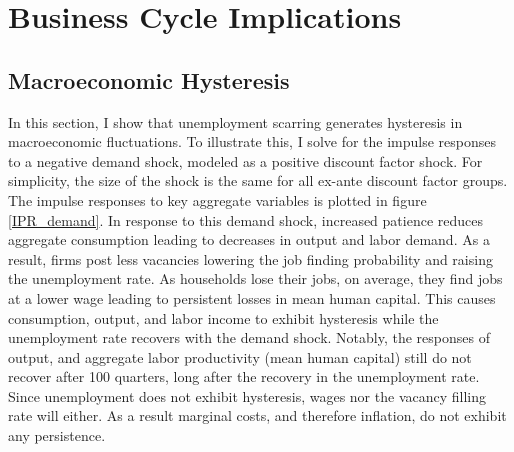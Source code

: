\section{Business Cycle Implications}


\subsection{Macroeconomic Hysteresis}

In this section, I show that unemployment scarring generates hysteresis in macroeconomic fluctuations. To illustrate this, I solve for the impulse responses to a negative demand shock, modeled as a positive discount factor shock. For simplicity, the size of the shock is the same for all ex-ante discount factor groups. The impulse responses to key aggregate variables is plotted in figure \ref{IPR_demand}. In response to this demand shock, increased patience reduces aggregate consumption leading to decreases in output and labor demand. As a result, firms post less vacancies lowering the job finding probability and raising the unemployment rate. As households lose their jobs, on average, they find jobs at a lower wage leading to persistent losses in mean human capital. This causes consumption, output, and labor income to exhibit hysteresis while the unemployment rate recovers with the demand shock. Notably, the responses of output, and aggregate labor productivity (mean human capital) still do not recover after 100 quarters, long after the recovery in the unemployment rate. Since unemployment does not exhibit hysteresis, wages nor the vacancy filling rate will either. As a result marginal costs, and therefore inflation, do not exhibit any persistence. 


